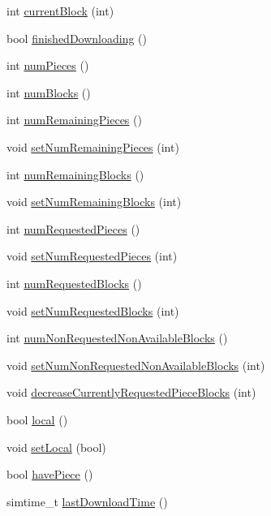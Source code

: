 \begin{DoxyCompactItemize}
\item 
int \hyperlink{classBitField_ac43f2900de3c3bf9fcef000769b3a9e7}{current\+Block} (int)
\item 
bool \hyperlink{classBitField_a29095dd18f528dd5772b97aa40d267b2}{finished\+Downloading} ()
\item 
int \hyperlink{classBitField_a7b930cde4be059cd50ad3772273c3f92}{num\+Pieces} ()
\item 
int \hyperlink{classBitField_ac9ceee65e3727bfa51882c621f9010b4}{num\+Blocks} ()
\item 
int \hyperlink{classBitField_ac4b18c3b59a9d285c6357cfa9eecd848}{num\+Remaining\+Pieces} ()
\item 
void \hyperlink{classBitField_aad8a041f764e82dfcfb9db68393306ac}{set\+Num\+Remaining\+Pieces} (int)
\item 
int \hyperlink{classBitField_a5827dc80e7a21e77a9ca02cf0e9e40f7}{num\+Remaining\+Blocks} ()
\item 
void \hyperlink{classBitField_ada5051c7ed068b2d5608f88296473b72}{set\+Num\+Remaining\+Blocks} (int)
\item 
int \hyperlink{classBitField_abcc7f9aab24281d30ee05110fe8d4dbc}{num\+Requested\+Pieces} ()
\item 
void \hyperlink{classBitField_af4354b2c5c2325e3224612794fa7f5c1}{set\+Num\+Requested\+Pieces} (int)
\item 
int \hyperlink{classBitField_aab778612b1788879ab8af5f4ffe0a99e}{num\+Requested\+Blocks} ()
\item 
void \hyperlink{classBitField_a25f725b3ff6a37d7c1ecfc4716142a36}{set\+Num\+Requested\+Blocks} (int)
\item 
int \hyperlink{classBitField_af5d0224419a073acfb969e731a47fd9a}{num\+Non\+Requested\+Non\+Available\+Blocks} ()
\item 
void \hyperlink{classBitField_aeed97c1a8befffc76c4057d810bdbddd}{set\+Num\+Non\+Requested\+Non\+Available\+Blocks} (int)
\item 
void \hyperlink{classBitField_af5970a0081c0bb511e989de40146e2eb}{decrease\+Currently\+Requested\+Piece\+Blocks} (int)
\item 
bool \hyperlink{classBitField_a9702d12e88ad507b45dc609777c01d22}{local} ()
\item 
void \hyperlink{classBitField_a5af51c0d3d580a15615ac48505e28924}{set\+Local} (bool)
\item 
bool \hyperlink{classBitField_a12c8dddec7afec5e0ddcfe82d8befc38}{have\+Piece} ()
\item 
simtime\+\_\+t \hyperlink{classBitField_aff81afe67c74bb715e0ee0b8735281a2}{last\+Download\+Time} ()

\end{DoxyCompactItemize}
